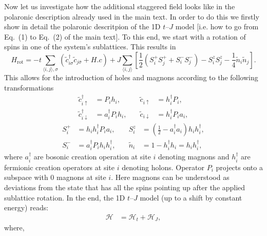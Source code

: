 \documentclass[%
 reprint,
 amsmath,amssymb,
 aps, onecolumn,
prl,
]{revtex4-1}
\newcommand{\mean}[1]{\langle#1\rangle}
\begin{document}
Now let us investigate how the additional staggered field looks like in the polaronic description already used in the main text. In order to 
do this we firstly show in detail the polaronic descritpion of the 1D $t$--$J$ model [i.e. how to go from Eq.~(1) to Eq.~(2) of the main text].
To this end, we start with a rotation of spins in one of the system's sublattices. This results in
%
\begin{equation}
	H_{\text{rot}} = -t\sum_{\mean{i,j},\sigma}\left(\tilde{c}_{i\sigma}^\dagger\tilde{c}_{j\bar{\sigma}} + H.c\right)
	+ J\sum_{\mean{i,j}}\left[\frac{1}{2}\left(S_i^+S_j^+ + S_i^-S_j^-\right) - S_i^zS_j^z - \frac{1}{4}\tilde{n}_i\tilde{n}_j\right].
\end{equation}
%
This allows for the introduction of holes and magnons according to the following transformations
%
{\color{red}
\begin{equation}
	\begin{aligned}
	\tilde{c}_{i\uparrow}^\dag &= P_i h_i, &\quad \tilde{c}_{i\uparrow} &= h_i^\dag P_i, \\
	\tilde{c}_{i\downarrow}^\dag &= a_i^\dag P_i h_i, &\quad \tilde{c}_{i\downarrow} &= h_i^\dag P_i a_i,
	\end{aligned}
\end{equation}
%
\begin{equation}
	\begin{aligned}
		S_i^+ &= h_i h_i^\dag P_i a_i, &\quad S_i^z &= \left(\frac{1}{2} - a_i^\dag a_i \right) h_i h_i^\dag, \\
		S_i^- &= a_i^\dag P_i h_i h_i^\dag, &\quad \tilde{n}_i &= 1 - h_i^\dag h_i = h_i h_i^\dag,
	\end{aligned}
\end{equation}
}
where $a_i^\dag$ are bosonic creation operation at site $i$ denoting magnons and $h_i^\dag$ are fermionic creation operators at site $i$ denoting holons. {\color{red}Operator $P_i$ projects onto a subspace with 0 magnons at site $i$.}
Here magnons can be understood as deviations from the state that has all the spins pointing up after the applied sublattice rotation. In the end, the 1D $t$--$J$ model (up to a shift by constant energy) reads:
%
\begin{align}
	\mathcal{H} &= \mathcal{H}_{t} + \mathcal{H}_{J},
\end{align}
%
where,
%	
\end{document}
